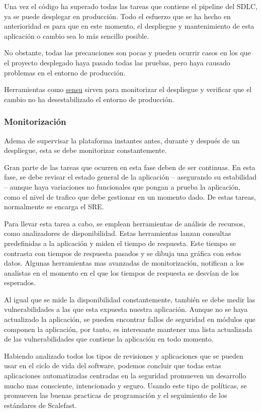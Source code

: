 \documentclass[12pt]{report} %
\begin{document}
Una vez el código ha superado todas las tareas que contiene el \gls{pipeline}
del \gls{SDLC}, ya se puede desplegar en producción.
Todo el esfuerzo que se ha hecho en anterioridad es para que en este momento, el
despliegue y mantenimiento de esta aplicación o cambio sea lo más sencillo
posible.

No obstante, todas las precauciones son pocas y pueden ocurrir casos en los que
el proyecto desplegado haya pasado todas las pruebas, pero haya causado
problemas en el entorno de producción.

Herramientas como \href{https://sensu.io/}{sensu} sirven para monitorizar el
despliegue y verificar que el cambio no ha desestabilizado el entorno de
producción.

\subsubsection{Monitorización} \label{monitorizacion}

Adema de supervisar la plataforma instantes antes, durante y después de un
despliegue, esta se debe monitorizar constantemente.

Gran parte de las tareas que ocurren en esta fase deben de ser continuas.
En esta fase, se debe revisar el estado general de la aplicación -- asegurando
su estabilidad -- aunque haya variaciones no funcionales que pongan a prueba la
aplicación, como el nivel de trafico que debe gestionar en un momento dado.
De estas tareas, normalmente se encarga el \acrfull{SRE}.

Para llevar esta tarea a cabo, se emplean herramientas de análisis de recursos,
como analizadores de disponibilidad.
Estas herramientas lanzan consultas predefinidas a la aplicación y miden el
tiempo de respuesta.
Este tiempo se contrasta con tiempos de respuesta pasados y se dibuja una
gráfica con estos datos.
Algunas herramientas mas avanzadas de monitorización, notifican a los analistas
en el momento en el que los tiempos de respuesta se desvían de los esperados.

Al igual que se mide la disponibilidad constantemente, también se debe medir las
vulnerabilidades a las que esta expuesta nuestra aplicación.
Aunque no se haya actualizado la aplicación, se pueden encontrar fallos de
seguridad en módulos que componen la aplicación, por tanto, es interesante
mantener una lista actualizada de las vulnerabilidades que contiene la
aplicación en todo momento.

Habiendo analizado todos los tipos de revisiones y aplicaciones que se pueden
usar en el ciclo de vida del software, podemos concluir que todas estas
aplicaciones automatizadas centradas en la seguridad promueven un desarrollo
mucho mas consciente, intencionado y seguro.  Usando este tipo de políticas, se
promueven las buenas practicas de programación y el seguimiento de los
estándares de Scalefast.
\end{document}
